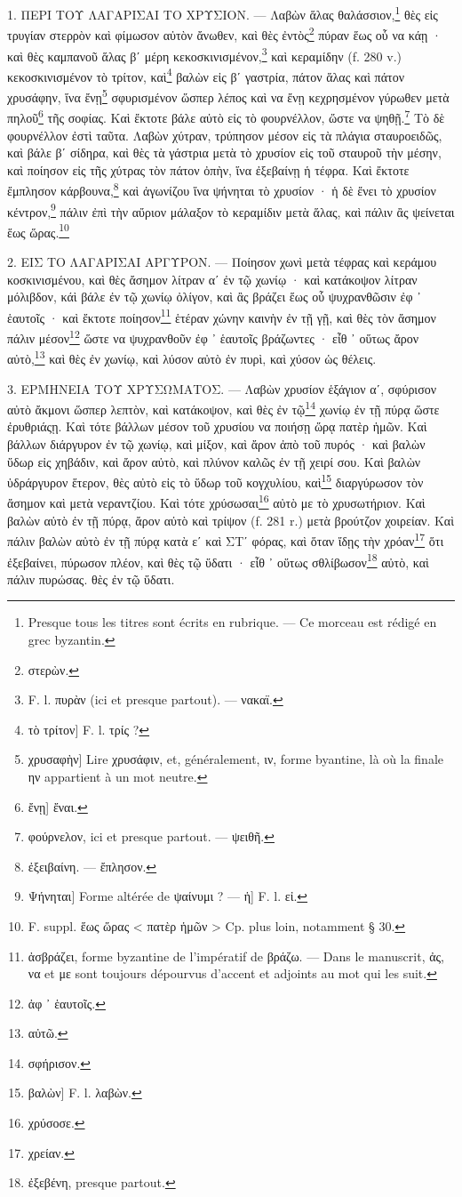 \documentclass[a4paper, 11pt, oneside, polutonikogreek, french]{article}
\begin{document}
\bigskip

1. ΠΕΡΙ ΤΟΥ ΛΑΓΑΡΙΣΑΙ ΤΟ ΧΡΥΣΙΟΝ. --- Λαβὼν ἅλας θαλάσσιον,\footnote{Presque tous les titres sont écrits en rubrique. --- Ce morceau est rédigé en grec byzantin.} θὲς εἰς τρυγίαν στερρὸν καὶ φίμωσον αὐτὸν ἄνωθεν, καὶ θὲς ἐντὸς\footnote{στερὼν.} πύραν ἕως οὗ να κάῃ · καὶ θὲς καμπανοῦ ἅλας βʹ μέρη κεκοσκινισμένον,\footnote{F. l. πυρὰν (ici et presque partout). --- νακαϊ.} καὶ κεραμίδην (f. 280 v.) κεκοσκινισμένον τὸ τρίτον, καὶ\footnote{τὸ τρίτον] F. l. τρίς ?} βαλὼν εἰς βʹ γαστρία, πάτον ἅλας καὶ πάτον χρυσάφην, ἵνα ἔνῃ\footnote{χρυσαφὴν] Lire χρυσάφιν, et, généralement, ιν, forme byantine, là où la finale ην appartient à un mot neutre.} σφυρισμένον ὥσπερ λέπος καὶ να ἔνῃ κεχρησμένον γύρωθεν μετὰ πηλοῦ\footnote{ἔνῃ] ἔναι.} τῆς σοφίας. Καὶ ἔκτοτε βάλε αὐτὸ εἰς τὸ φουρνέλλον, ὥστε να ψηθῇ.\footnote{φούρνελον, ici et presque partout. --- ψειθῆ.} Τὸ δὲ φουρνέλλον ἐστὶ ταῦτα. Λαβὼν χύτραν, τρύπησον μέσον εἰς τὰ πλάγια σταυροειδῶς, καὶ βάλε βʹ σίδηρα, καὶ θὲς τὰ γάστρια μετὰ τὸ χρυσίον εἰς τοῦ σταυροῦ τὴν μέσην, καὶ ποίησον εἰς τῆς χύτρας τὸν πάτον ὀπὴν, ἵνα ἐξεβαίνῃ ἡ τέφρα. Καὶ ἔκτοτε ἔμπλησον κάρβουνα,\footnote{ἐξειβαίνη. --- ἔπλησον.} καὶ ἀγωνίζου ἵνα ψήνηται τὸ χρυσίον · ἡ δὲ ἔνει τὸ χρυσίον κέντρον,\footnote{Ψήνηται] Forme altérée de ψαίνυμι ? --- ἡ] F. l. εἰ.} πάλιν ἐπὶ τὴν αὔριον μάλαξον τὸ κεραμίδιν μετὰ ἅλας, καὶ πάλιν ἂς ψείνεται ἕως ὥρας.\footnote{F. suppl. ἕως ὥρας < πατὲρ ἡμῶν > Cp. plus loin, notamment § 30.}

2. ΕΙΣ ΤΟ ΛΑΓΑΡΙΣΑΙ ΑΡΓΥΡΟΝ. --- Ποίησον χωνὶ μετὰ τέφρας καὶ κεράμου κοσκινισμένου, καὶ θὲς ἄσημον λίτραν αʹ ἐν τῷ χωνίῳ · καὶ κατάκοψον λίτραν μόλιβδον, κάὶ βάλε ἐν τῷ χωνίῳ ὀλίγον, καὶ ἂς βράζει ἕως οὗ ψυχρανθῶσιν ἐφ ᾽ ἑαυτοῖς · καὶ ἔκτοτε ποίησον\footnote{ἀσβράζει, forme byzantine de l'impératif de βράζω. --- Dans le manuscrit, ἀς, να et με sont toujours dépourvus d'accent et adjoints au mot qui les suit.} ἑτέραν χώνην καινὴν ἐν τῇ γῇ, καὶ θὲς τὸν ἄσημον πάλιν μέσον\footnote{ἀφ ᾽ ἑαυτοῖς.} ὥστε να ψυχρανθοῦν ἐφ ᾽ ἑαυτοῖς βράζωντες · εἶθ ᾽ οὕτως ἄρον αὐτὸ,\footnote{αὐτῶ.} καὶ θὲς ἐν χωνίῳ, καὶ λύσον αὐτὸ ἐν πυρὶ, καὶ χύσον ὡς θέλεις.

3. ΕΡΜΗΝΕΙΑ ΤΟΥ ΧΡΥΣΩΜΑΤΟΣ. --- Λαβὼν χρυσίον ἑξάγιον αʹ, σφύρισον αὐτὸ ἄκμονι ὥσπερ λεπτὸν, καὶ κατάκοψον, καὶ θὲς ἐν τῷ\footnote{σφήρισον.} χωνίῳ ἐν τῇ πύρᾳ ὥστε ἐρυθριάςῃ. Καὶ τότε βάλλων μέσον τοῦ χρυσίου να ποιήσῃ ὥρᾳ πατὲρ ἡμῶν. Καὶ βάλλων διάργυρον ἐν τῷ χωνίῳ, καὶ μίξον, καὶ ἄρον ἀπὸ τοῦ πυρός · καὶ βαλὼν ὕδωρ εἰς χηβάδιν, καὶ ἄρον αὐτὸ, καὶ πλύνον καλῶς ἐν τῇ χειρί σου. Καὶ βαλὼν ὑδράργυρον ἕτερον, θὲς αὐτὸ εἰς τὸ ὕδωρ τοῦ κογχυλίου, καὶ\footnote{βαλὼν] F. l. λαβὼν.} διαργύρωσον τὸν ἄσημον καὶ μετὰ νεραντζίου. Καὶ τότε χρύσωσαι\footnote{χρύσοσε.} αὐτὸ με τὸ χρυσωτήριον. Καὶ βαλὼν αὐτὸ ἐν τῇ πύρᾳ, ἄρον αὐτὸ καὶ τρίψον (f. 281 r.) μετὰ βρούτζον χοιρείαν. Καὶ πάλιν βαλὼν αὐτὸ ἐν τῇ πύρᾳ κατὰ εʹ καὶ ΣΤʹ φόρας, καὶ ὅταν ἴδῃς τὴν χρόαν\footnote{χρείαν.} ὅτι ἐξεβαίνει, πύρωσον πλέον, καὶ θὲς τῷ ὕδατι · εἶθ ᾽ οὕτως σθλίβωσον\footnote{ἐξεβένη, presque partout.} αὐτὸ, καὶ πάλιν πυρώσας. θὲς ἐν τῷ ὕδατι.
\end{document}
